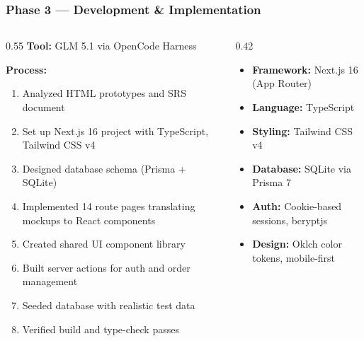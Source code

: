 \documentclass[aspectratio=169,professionalfonts,10pt]{beamer}
\begin{document}
\begin{frame}
    \frametitle{Phase 3 --- Development \& Implementation}
    \small
    \begin{columns}[T]
        \begin{column}{0.55\textwidth}
            \textbf{Tool:} GLM 5.1 via OpenCode Harness

            \vspace{0.3em}
            \textbf{Process:}
            \begin{enumerate}\setlength{\itemsep}{1pt}
                \item Analyzed HTML prototypes and SRS document
                \item Set up Next.js 16 project with TypeScript, Tailwind CSS v4
                \item Designed database schema (Prisma + SQLite)
                \item Implemented 14 route pages translating mockups to React components
                \item Created shared UI component library
                \item Built server actions for auth and order management
                \item Seeded database with realistic test data
                \item Verified build and type-check passes
            \end{enumerate}
        \end{column}

        \begin{column}{0.42\textwidth}
            \begin{tcolorbox}[colback=cucigoTeal!10,colframe=cucigoTeal,title=\small Tech Stack]
                \scriptsize
                \begin{itemize}\setlength{\itemsep}{1pt}
                    \item \textbf{Framework:} Next.js 16 (App Router)
                    \item \textbf{Language:} TypeScript
                    \item \textbf{Styling:} Tailwind CSS v4
                    \item \textbf{Database:} SQLite via Prisma 7
                    \item \textbf{Auth:} Cookie-based sessions, bcryptjs
                    \item \textbf{Design:} Oklch color tokens, mobile-first
                \end{itemize}
            \end{tcolorbox}
        \end{column}
    \end{columns}
\end{frame}
\end{document}
